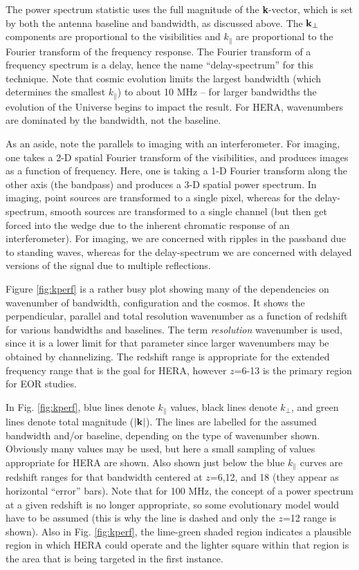 \documentclass[preprint,11pt]{aastex}
\newcommand{\kvec}{{\bf k}}
\newcommand{\kpr}{{k_\perp}}
\newcommand{\kvpr}{{\kvec_\perp}}
\def\kpar{k_{\|}}
\begin{document}
The power spectrum statistic uses the full magnitude of the {\bf k}-vector, which is set by both the antenna baseline and bandwidth, as discussed above.  The $\kvpr$ components are proportional to the visibilities and $\kpar$ are proportional to the Fourier transform of the frequency response.   The Fourier transform of a frequency spectrum is a delay, hence the name ``delay-spectrum'' for this technique.  Note that cosmic evolution limits the largest bandwidth (which determines the smallest $\kpar$) to about 10 MHz -- for larger bandwidths the evolution of the Universe begins to impact the result.  For HERA, wavenumbers are dominated by the bandwidth, not the baseline.

As an aside, note the parallels to imaging with an interferometer.  For imaging, one takes a 2-D spatial Fourier transform of the visibilities, and produces images as a function of frequency.  Here, one is taking a 1-D Fourier transform along the other axis (the bandpass) and produces a 3-D spatial power spectrum.  In imaging, point sources are transformed to a single pixel, whereas for the delay-spectrum, smooth sources are transformed to a single channel (but then get forced into the wedge due to the inherent chromatic response of an interferometer).  For imaging, we are concerned with ripples in the passband due to standing waves, whereas for the delay-spectrum we are concerned with delayed versions of the signal due to multiple reflections.

Figure \ref{fig:kperf} is a rather busy plot showing many of the dependencies on wavenumber of bandwidth, configuration and the cosmos.  It shows the perpendicular, parallel and total resolution wavenumber as a function of redshift for various bandwidths and baselines.  The term {\em resolution} wavenumber is used, since it is a lower limit for that parameter since larger wavenumbers may be obtained by channelizing.  The redshift range is appropriate for the extended frequency range that is the goal for HERA, however $z$=6-13 is the primary region for EOR studies.

In Fig. \ref{fig:kperf}, blue lines denote $\kpar$ values, black lines denote $\kpr$, and green lines denote total magnitude ($|{\kvec}|$).  The lines are labelled for the assumed bandwidth and/or baseline, depending on the type of wavenumber shown.  Obviously many values may be used, but here a small sampling of values appropriate for HERA are shown.    Also shown just below the blue $\kpar$ curves are redshift ranges for that bandwidth centered at $z$=6,12, and 18 (they appear as horizontal ``error'' bars).  Note that for 100 MHz, the concept of a power spectrum at a given redshift is no longer appropriate, so some evolutionary model would have to be assumed (this is why the line is dashed and only the $z$=12 range is shown).
Also in Fig. \ref{fig:kperf}, the lime-green shaded region indicates a plausible region in which HERA could operate and the lighter square within that region is the area that is being targeted in the first instance.
\end{document}
